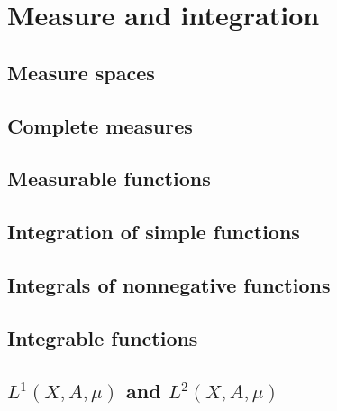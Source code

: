 \chapter{Measure and integration}

\section{Measure spaces}
\section{Complete measures}
\section{Measurable functions}
\section{Integration of simple functions}
\section{Integrals of nonnegative functions}
\section{Integrable functions}
\section{\( L^1\left( X, A, \mu \right) \) and \( L^2 \left(X, A, \mu \right)\)}

